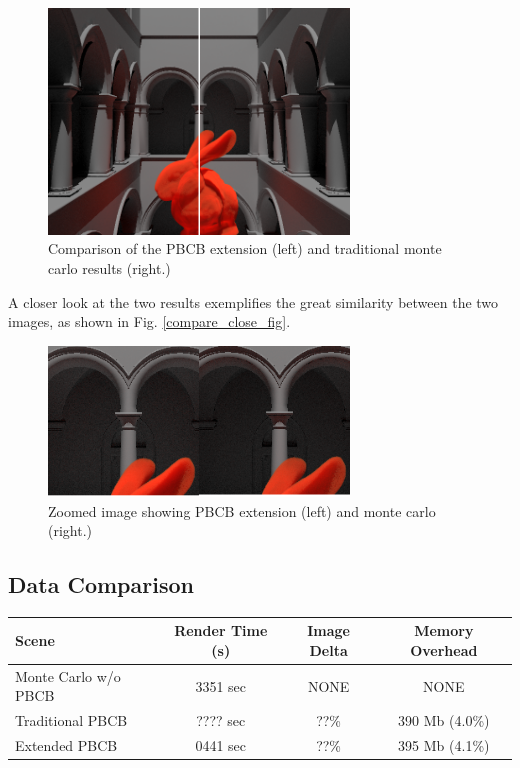 \documentclass[runningheads]{llncs}
\begin{document}
\begin{figure}[h!]
    \centering
    \includegraphics[width=80mm]{img/compare.png}
    \caption{Comparison of the PBCB extension (left) and traditional monte carlo results (right.)}
    \label{compare_fig}
\end{figure}

A closer look at the two results exemplifies the great similarity between the two images, as shown in Fig. \ref{compare_close_fig}.

\begin{figure}[h!]
    \centering
    \includegraphics[width=80mm]{img/compare1.png}
    \caption{Zoomed image showing PBCB extension (left) and monte carlo (right.)}
    \label{compare_fig}
\end{figure}

\subsection{Data Comparison}

\begin{center}
\setlength{\tabcolsep}{5pt}
\begin{tabular}{ | l | c | c | c | }
  \hline                       
  Scene & Render Time (s) & Image Delta & Memory Overhead \\
  \hline                  
  Monte Carlo w/o PBCB & 3351 sec & NONE & NONE \\
  Traditional PBCB & ???? sec & ??\% & 390 Mb (4.0\%) \\
  Extended PBCB & 0441 sec & ??\% & 395 Mb (4.1\%)  \\
  \hline  
\end{tabular}
\end{center}
\end{document}
